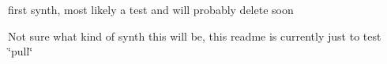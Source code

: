 first synth, most likely a test and will probably delete soon

Not sure what kind of synth this will be, this readme is currently just to test \char`\"{}pull\char`\"{} 
